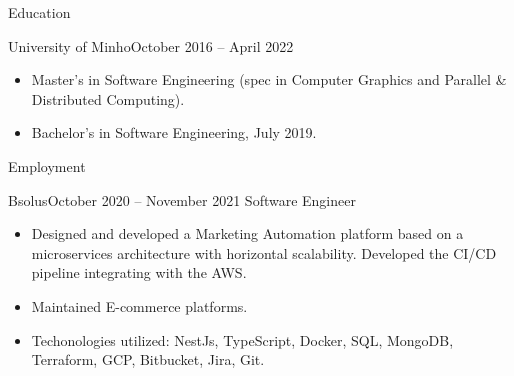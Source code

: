 \documentclass[]{mcdowellcv}
\begin{document}
	\makeheader
	
	\begin{cvsection}{Education}
		\begin{cvsubsection}{University of Minho}{}{October 2016 -- April 2022}
			\begin{itemize}
                \item Master’s in Software Engineering (spec in Computer Graphics and Parallel \& Distributed Computing).
                \item Bachelor's in Software Engineering, July 2019.
			\end{itemize}
		\end{cvsubsection}
	\end{cvsection}
	
	\begin{cvsection}{Employment}
		\begin{cvsubsection}{Bsolus}{}{October 2020 -- November 2021}
			Software Engineer
			\begin{itemize}
                \item Designed and developed a Marketing Automation platform based on a microservices architecture with horizontal scalability. Developed the CI/CD pipeline integrating with the AWS.
                \item Maintained E-commerce platforms.
                \item Techonologies utilized: NestJs, TypeScript, Docker, SQL, MongoDB, Terraform, GCP, Bitbucket, Jira, Git.
			\end{itemize}
		\end{cvsubsection}
	\end{cvsection}
\end{document}
